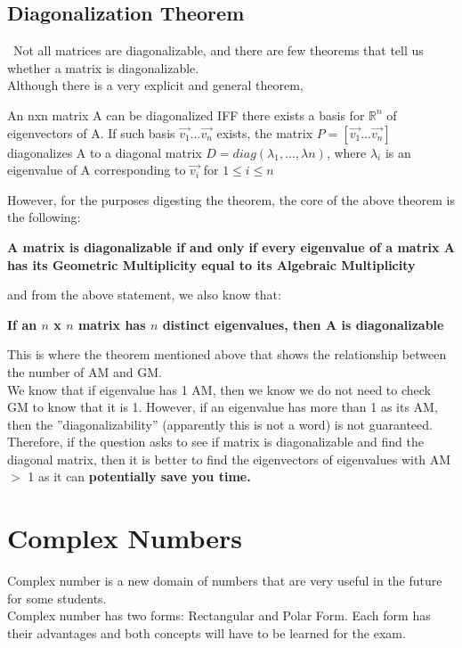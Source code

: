 \documentclass[12pt]{article}
\newcommand{\R}{\mathbb{R}}
\begin{document}
\subsection{Diagonalization Theorem}\
Not all matrices are diagonalizable, and there are few theorems that tell us whether a matrix is diagonalizable. \\
Although there is a very explicit and general theorem,\\
\begin{center}
\noindent
An nxn matrix A can be diagonalized IFF there exists a basis for $\R^n$ of eigenvectors of A. 
If such basis ${\vec{v_1}...\vec{v_n}}$ exists, the matrix $P = [\vec{v_1}...\vec{v_n}]$ diagonalizes A to a diagonal matrix $D = diag(\lambda_1,...,\lambda{n})$, where $\lambda_i$ is an eigenvalue of A corresponding to $\vec{v_i}$ for $1\leq i \leq n$\\
\end{center}
\noindent
However, for the purposes digesting the theorem, the core of the above theorem is the following:\\
\begin{center}
\textbf{A matrix is diagonalizable if and only if every eigenvalue of a matrix A has its Geometric Multiplicity equal to its Algebraic Multiplicity}
\end{center}
\noindent
and from the above statement, we also know that:\\
\begin{center}
\textbf{If an $n$ x $n$ matrix has $n$ distinct eigenvalues, then A is diagonalizable}
\end{center}
\noindent
This is where the theorem mentioned above that shows the relationship between the number of AM and GM.\\
We know that if eigenvalue has 1 AM, then we know we do not need to check GM to know that it is 1. However, if an eigenvalue has more than 1 as its AM, then the ''diagonalizability'' (apparently this is not a word) is not guaranteed.  Therefore, if the question asks to see if matrix is diagonalizable and find the diagonal matrix, then it is better to find the eigenvectors of eigenvalues with AM $>$ 1 as it can \textbf{potentially save you time.}

\section{Complex Numbers}
Complex number is a new domain of numbers that are very useful in the future for some students.\\
Complex number has two forms: Rectangular and Polar Form. Each form has their advantages and both concepts will have to be learned for the exam.\\
\end{document}
